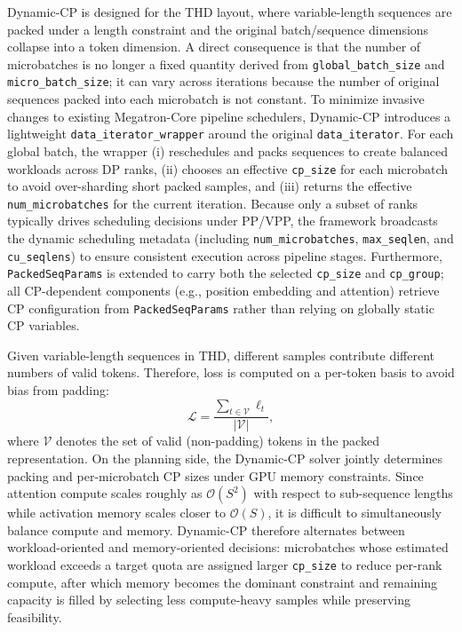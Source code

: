 Dynamic-CP is designed for the THD layout, where variable-length sequences are packed under a length constraint and the original batch/sequence dimensions collapse into a token dimension. A direct consequence is that the number of microbatches is no longer a fixed quantity derived from \texttt{global\_batch\_size} and \texttt{micro\_batch\_size}; it can vary across iterations because the number of original sequences packed into each microbatch is not constant. To minimize invasive changes to existing Megatron-Core pipeline schedulers, Dynamic-CP introduces a lightweight \texttt{data\_iterator\_wrapper} around the original \texttt{data\_iterator}. For each global batch, the wrapper (i) reschedules and packs sequences to create balanced workloads across DP ranks, (ii) chooses an effective \texttt{cp\_size} for each microbatch to avoid over-sharding short packed samples, and (iii) returns the effective \texttt{num\_microbatches} for the current iteration. Because only a subset of ranks typically drives scheduling decisions under PP/VPP, the framework broadcasts the dynamic scheduling metadata (including \texttt{num\_microbatches}, \texttt{max\_seqlen}, and \texttt{cu\_seqlens}) to ensure consistent execution across pipeline stages. Furthermore, \texttt{PackedSeqParams} is extended to carry both the selected \texttt{cp\_size} and \texttt{cp\_group}; all CP-dependent components (e.g., position embedding and attention) retrieve CP configuration from \texttt{PackedSeqParams} rather than relying on globally static CP variables.

Given variable-length sequences in THD, different samples contribute different numbers of valid tokens. Therefore, loss is computed on a per-token basis to avoid bias from padding:
\begin{equation}
\mathcal{L} = \frac{\sum_{t\in \mathcal{V}} \ell_t}{|\mathcal{V}|},
\end{equation}
where $\mathcal{V}$ denotes the set of valid (non-padding) tokens in the packed representation. On the planning side, the Dynamic-CP solver jointly determines packing and per-microbatch CP sizes under GPU memory constraints. Since attention compute scales roughly as $\mathcal{O}(S^2)$ with respect to sub-sequence lengths while activation memory scales closer to $\mathcal{O}(S)$, it is difficult to simultaneously balance compute and memory. Dynamic-CP therefore alternates between workload-oriented and memory-oriented decisions: microbatches whose estimated workload exceeds a target quota are assigned larger \texttt{cp\_size} to reduce per-rank compute, after which memory becomes the dominant constraint and remaining capacity is filled by selecting less compute-heavy samples while preserving feasibility.

